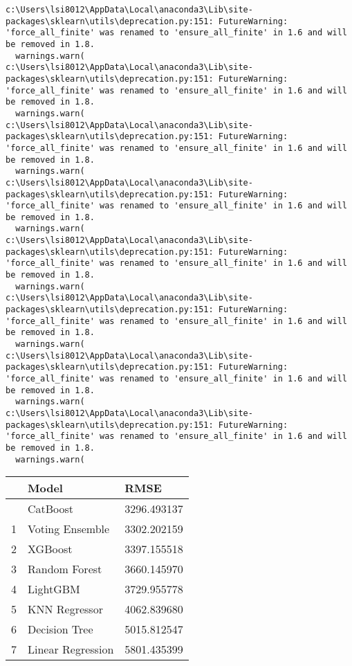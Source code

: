 \documentclass[
  letterpaper,
  DIV=11,
  numbers=noendperiod]{scrreprt}
\begin{document}
\begin{verbatim}
c:\Users\lsi8012\AppData\Local\anaconda3\Lib\site-packages\sklearn\utils\deprecation.py:151: FutureWarning: 'force_all_finite' was renamed to 'ensure_all_finite' in 1.6 and will be removed in 1.8.
  warnings.warn(
c:\Users\lsi8012\AppData\Local\anaconda3\Lib\site-packages\sklearn\utils\deprecation.py:151: FutureWarning: 'force_all_finite' was renamed to 'ensure_all_finite' in 1.6 and will be removed in 1.8.
  warnings.warn(
c:\Users\lsi8012\AppData\Local\anaconda3\Lib\site-packages\sklearn\utils\deprecation.py:151: FutureWarning: 'force_all_finite' was renamed to 'ensure_all_finite' in 1.6 and will be removed in 1.8.
  warnings.warn(
c:\Users\lsi8012\AppData\Local\anaconda3\Lib\site-packages\sklearn\utils\deprecation.py:151: FutureWarning: 'force_all_finite' was renamed to 'ensure_all_finite' in 1.6 and will be removed in 1.8.
  warnings.warn(
c:\Users\lsi8012\AppData\Local\anaconda3\Lib\site-packages\sklearn\utils\deprecation.py:151: FutureWarning: 'force_all_finite' was renamed to 'ensure_all_finite' in 1.6 and will be removed in 1.8.
  warnings.warn(
c:\Users\lsi8012\AppData\Local\anaconda3\Lib\site-packages\sklearn\utils\deprecation.py:151: FutureWarning: 'force_all_finite' was renamed to 'ensure_all_finite' in 1.6 and will be removed in 1.8.
  warnings.warn(
c:\Users\lsi8012\AppData\Local\anaconda3\Lib\site-packages\sklearn\utils\deprecation.py:151: FutureWarning: 'force_all_finite' was renamed to 'ensure_all_finite' in 1.6 and will be removed in 1.8.
  warnings.warn(
c:\Users\lsi8012\AppData\Local\anaconda3\Lib\site-packages\sklearn\utils\deprecation.py:151: FutureWarning: 'force_all_finite' was renamed to 'ensure_all_finite' in 1.6 and will be removed in 1.8.
  warnings.warn(
\end{verbatim}

\begin{longtable}[]{@{}lll@{}}
\toprule\noalign{}
& Model & RMSE \\
\midrule\noalign{}
\endhead
\bottomrule\noalign{}
\endlastfoot
0 & CatBoost & 3296.493137 \\
1 & Voting Ensemble & 3302.202159 \\
2 & XGBoost & 3397.155518 \\
3 & Random Forest & 3660.145970 \\
4 & LightGBM & 3729.955778 \\
5 & KNN Regressor & 4062.839680 \\
6 & Decision Tree & 5015.812547 \\
7 & Linear Regression & 5801.435399 \\
\end{longtable}
\end{document}
